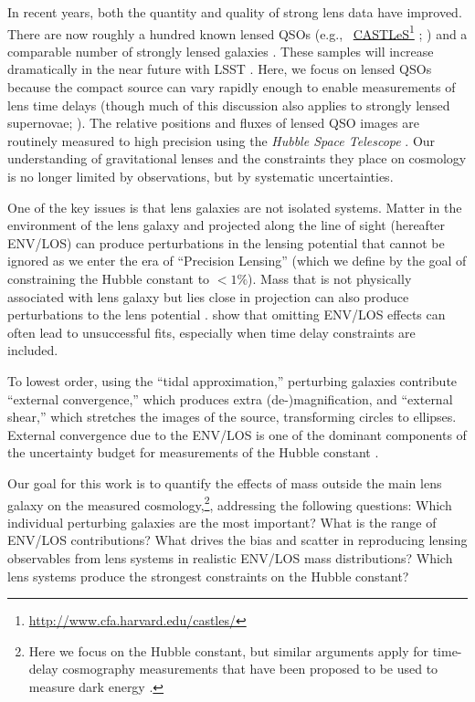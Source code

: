 \documentclass{emulateapj}
\newcommand\fnurl[2]{%
\href{#2}{#1}\footnote{\url{#2}}%
}
\begin{document}
In recent years, both the quantity and quality of strong lens data have improved. There are now roughly a hundred known lensed QSOs (e.g.,\ \fnurl{CASTLeS}{http://www.cfa.harvard.edu/castles/}; \citealt{SQLS,CLASS}) and a comparable number of strongly lensed galaxies \citep[e.g.,][]{Bolton08,Cassowary}. These samples will increase dramatically in the near future with LSST \citep[e.g.,][]{LSST, Coe09, Oguri10, Collett15}. Here, we focus on lensed QSOs because the compact source can vary rapidly enough to enable measurements of lens time delays (though much of this discussion also applies to strongly lensed supernovae; \citealt{Kelly15}). The relative positions and fluxes of lensed QSO images are routinely measured to high precision using the \textit{Hubble Space Telescope} \citep[e.g,.][and references therein; CASTLeS Collaboration]{Lehar00,Sluse12}. Our understanding of gravitational lenses and the constraints they place on cosmology is no longer limited by observations, but by systematic uncertainties. 

One of the key issues is that lens galaxies are not isolated systems. Matter in the environment of the lens galaxy and projected along the line of sight (hereafter ENV/LOS) can produce perturbations in the lensing potential that cannot be ignored as we enter the era of ``Precision Lensing'' (which we define by the goal of constraining the Hubble constant to $<1\%$). Mass that is not physically associated with lens galaxy but lies close in projection can also produce perturbations to the lens potential \citep[e.g.,][]{Bar-Kana96,Momcheva06,Wong11}. \citet{Jaroszynski14} show that omitting ENV/LOS effects can often lead to unsuccessful fits, especially when time delay constraints are included.

To lowest order, using the ``tidal approximation,'' perturbing galaxies contribute ``external convergence,'' which produces extra (de-)magnification, and ``external shear,'' which stretches the images of the source, transforming circles to ellipses. External convergence due to the ENV/LOS is one of the dominant components of the uncertainty budget for measurements of the Hubble constant \citep{Suyu12}.

Our goal for this work is to quantify the effects of mass outside the main lens galaxy on the measured cosmology,\footnote{Here we focus on the Hubble constant, but similar arguments apply for time-delay cosmography measurements that have been proposed to be used to measure dark energy \citep{Treu13}.}, addressing the following questions:
Which individual perturbing galaxies are the most important?
What is the range of ENV/LOS contributions?
What drives the bias and scatter in reproducing lensing observables from lens systems in realistic ENV/LOS mass distributions?
Which lens systems produce the strongest constraints on the Hubble constant?
\end{document}
